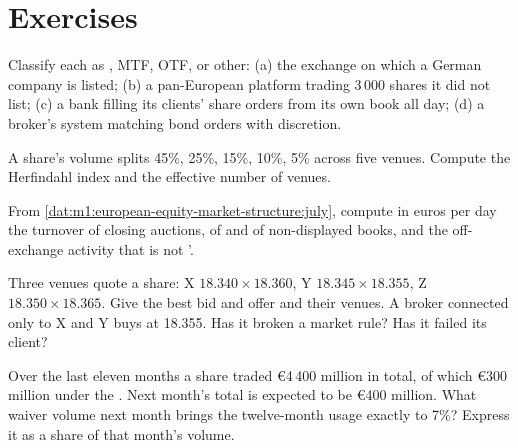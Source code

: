 \section{Exercises}

\begin{exercise}[$\star$]\label{exo:m1:european-equity-market-structure:1}
Classify each as , MTF, OTF,  or
other: (a) the exchange on which a German company is listed; (b) a
pan-European platform trading 3\,000 shares it did not list; (c) a bank
filling its clients' share orders from its own book all day; (d) a broker's
system matching bond orders with discretion.
\end{exercise}

\begin{exercise}[$\star$]\label{exo:m1:european-equity-market-structure:2}
A share's volume splits 45\%, 25\%, 15\%, 10\%, 5\% across five venues.
Compute the Herfindahl index and the effective number of venues.
\end{exercise}

\begin{exercise}[$\star$]\label{exo:m1:european-equity-market-structure:3}
From \cref{dat:m1:european-equity-market-structure:july}, compute in euros per
day the turnover of closing auctions, of  and of
non-displayed books, and the off-exchange activity that is not '.
\end{exercise}

\begin{exercise}[$\star\star$]\label{exo:m1:european-equity-market-structure:4}
Three venues quote a share: X $18.340 \times 18.360$, Y $18.345 \times
18.355$, Z $18.350 \times 18.365$. Give the best bid and offer and their
venues. A broker connected only to X and Y buys at 18.355. Has it broken a
market rule? Has it failed its client?
\end{exercise}

\begin{exercise}[$\star\star$]\label{exo:m1:european-equity-market-structure:5}
Over the last eleven months a share traded \euro 4\,400 million in total, of
which \euro 300 million under the . Next month's total
is expected to be \euro 400 million. What waiver volume next month brings the
twelve-month usage exactly to 7\%? Express it as a share of that month's
volume.
\end{exercise}

